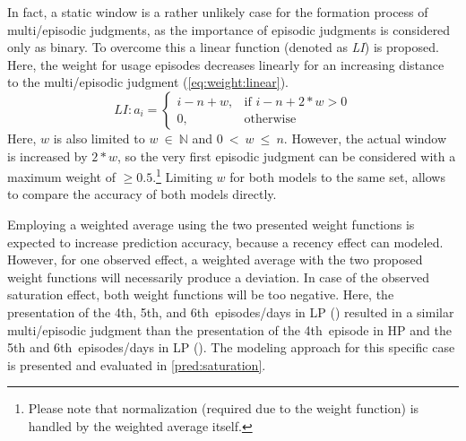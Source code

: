 In fact, a static window is a rather unlikely case for the formation process of multi\-/episodic judgments, as the importance of episodic judgments is considered only as binary.
To overcome this a linear function (denoted as \emph{LI}) is proposed.
Here, the weight for usage episodes decreases linearly for an increasing distance to the multi\-/episodic judgment (\autoref{eq:weight:linear}).
\begin{equation}\label{eq:weight:linear}  %
LI: a_i= \left\{
\begin{array}{ll}
	i - n + w,& \text{if } i - n + 2*w > 0 \\
  0,& \text{otherwise}
\end{array}
\right.
\end{equation}
Here, $\mathit{w}$ is also limited to $\mathit{w}~\in~\mathbb{N}$ and $0~<~\mathit{w}~\leq~\mathit{n}$.
However, the actual window is increased by $\mathit{2*w}$, so the very first episodic judgment can be considered with a maximum weight of $\geq 0.5$.\footnote{Please note that normalization (required due to the weight function) is handled by the weighted average itself.}
Limiting $\mathit{w}$ for both models to the same set, allows to compare the accuracy of both models directly.

Employing a weighted average using the two presented weight functions is expected to increase prediction accuracy, because a recency effect can modeled.
However, for one observed effect, a weighted average with the two proposed weight functions will necessarily produce a deviation.
In case of the observed saturation effect, both weight functions will be too negative.
Here, the presentation of the 4th, 5th, and 6th~episodes/days in \ac{LP} () resulted in a similar multi\-/episodic judgment than the presentation of the 4th~episode in \ac{HP}  and the 5th and 6th~episodes/days in \ac{LP} ().
The modeling approach for this specific case is presented and evaluated in \autoref{pred:saturation}.
%

